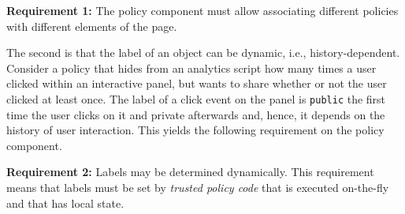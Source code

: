 \medskip
\noindent \textbf{Requirement 1:} The policy component must allow
associating different policies with different elements of the page.
\medskip

The second is that the label of an object can be dynamic, i.e.,
history-dependent. Consider a policy that hides from an analytics
script how many times a user clicked within an interactive panel, but
wants to share whether or not the user clicked at least once. The
label of a click event on the panel is \texttt{public} the first time
the user clicks on it and private afterwards and, hence, it depends on
the history of user interaction. This yields the following requirement
on the policy component.

\medskip
\noindent \textbf{Requirement 2:} Labels may be determined
dynamically. This requirement means that labels must be set by
\emph{trusted policy code} that is executed on-the-fly and that has
local state.
\medskip


